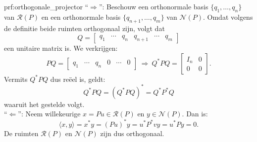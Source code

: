 \begin{prf}{prf:orthogonale_projector}
    ``$\Rightarrow$'': Beschouw een orthonormale basis $\{q_1, \ldots, q_n\}$ van $\mathcal{R}(P)$ en een orthonormale basis $\{q_{n+1}, \ldots, q_m\}$ van $\mathcal{N}(P)$. Omdat volgens de definitie beide ruimten orthogonaal zijn, volgt dat
    \begin{equation*}
        Q = \begin{bmatrix} q_1 & \cdots & q_n & q_{n+1} & \cdots & q_m \end{bmatrix}
    \end{equation*}
     een unitaire matrix is. We verkrijgen:
    \begin{equation*}
        PQ = \begin{bmatrix} q_1 & \cdots & q_n &0 & \cdots & 0 \end{bmatrix} \ \Rightarrow \ Q^*PQ = \begin{bmatrix} I_n & 0 \\ 0 & 0 \end{bmatrix}.
    \end{equation*}
    Vermits $Q^*PQ$ dus reëel is, geldt:
    \begin{equation*}
        Q^*PQ = (Q^*PQ)^* = Q^*P^*Q
    \end{equation*}
    waaruit het gestelde volgt. \\

    ``$\Leftarrow$'': Neem willekeurige $x = Pu \in \mathcal{R}(P)$ en $y \in \mathcal{N}(P)$. Dan is:
    \begin{equation*}
        \langle x, y \rangle = x^*y = (Pu)^*y = u^*P^*vy= u^*Py = 0.
    \end{equation*}
    De ruimten $\mathcal{R}(P)$ en $\mathcal{N}(P)$ zijn dus orthogonaal.
    \vspace{-0.3cm}
\end{prf}